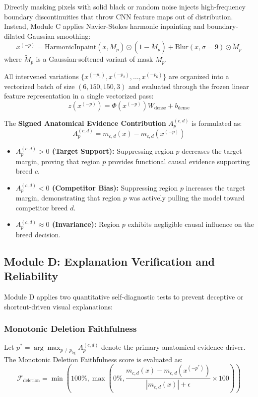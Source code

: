 \documentclass[conference]{IEEEtran}
\begin{document}
Directly masking pixels with solid black or random noise injects high-frequency boundary discontinuities that throw CNN feature maps out of distribution. Instead, Module C applies Navier-Stokes harmonic inpainting and boundary-dilated Gaussian smoothing:
\begin{equation}
x^{(-p)} = \text{HarmonicInpaint}(x, M_p) \odot (1 - \tilde{M}_p) + \text{Blur}(x, \sigma=9) \odot \tilde{M}_p
\end{equation}
where $\tilde{M}_p$ is a Gaussian-softened variant of mask $M_p$.

All intervened variations $\{x^{(-p_1)}, x^{(-p_2)}, \dots, x^{(-p_6)}\}$ are organized into a vectorized batch of size $(6, 150, 150, 3)$ and evaluated through the frozen linear feature representation in a single vectorized pass:
\begin{equation}
z(x^{(-p)}) = \Phi(x^{(-p)}) W_{\text{dense}} + b_{\text{dense}}
\end{equation}

The \textbf{Signed Anatomical Evidence Contribution} $A_p^{(c,d)}$ is formulated as:
\begin{equation}
\boxed{A_p^{(c,d)} = m_{c,d}(x) - m_{c,d}(x^{(-p)})}
\end{equation}
\begin{itemize}
    \item \textbf{$A_p^{(c,d)} > 0$ (Target Support):} Suppressing region $p$ decreases the target margin, proving that region $p$ provides functional causal evidence supporting breed $c$.
    \item \textbf{$A_p^{(c,d)} < 0$ (Competitor Bias):} Suppressing region $p$ increases the target margin, demonstrating that region $p$ was actively pulling the model toward competitor breed $d$.
    \item \textbf{$A_p^{(c,d)} \approx 0$ (Invariance):} Region $p$ exhibits negligible causal influence on the breed decision.
\end{itemize}

\subsection{Module D: Explanation Verification and Reliability}
Module D applies two quantitative self-diagnostic tests to prevent deceptive or shortcut-driven visual explanations:

\subsubsection{Monotonic Deletion Faithfulness}
Let $p^* = \arg\max_{p \neq p_{\text{bg}}} A_p^{(c,d)}$ denote the primary anatomical evidence driver. The Monotonic Deletion Faithfulness score is evaluated as:
\begin{equation}
\mathcal{F}_{\text{deletion}} = \min\left(100\%, \max\left(0\%, \frac{m_{c,d}(x) - m_{c,d}(x^{(-p^*)})}{|m_{c,d}(x)| + \epsilon} \times 100\right)\right)
\end{equation}
\end{document}
